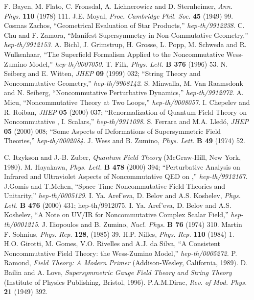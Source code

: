 \documentclass[a4paper,a4paper]{article}
\begin{document}
\begin{thebibliography}{Ref}
 F. Bayen, M. Flato, C. Fronsdal, A. Lichnerowicz and D. Sternheimer, 
{\sl Ann. Phys.} {\bf 110} (1978) 111. 
 J.E. Moyal, {\sl Proc. Cambridge Phil. Soc.} {\bf 45} (1949) 99.
 Cosmas Zachos, ``Geometrical Evaluation of Star Products,'' 
{\it hep-th/9912238}.
 C. Chu and F. Zamora, ``Manifest Supersymmetry in Non-Commutative 
Geometry,'' {\it hep-th/9912153}.
 A. Bichl, J. Grimstrup, H. Grosse, L. Popp, M. Schweda and R. Wulkenhaar, 
``The Superfield Formalism Applied to the Noncommutative Wess-Zumino Model,'' 
{\it hep-th/0007050}.
 T. Filk, {\sl Phys. Lett.} {\bf B 376} (1996) 53.
 N. Seiberg and E. Witten, {\sl JHEP} {\bf 09} (1999) 032; 
``String Theory and Noncommutative Geometry,'' {\it hep-th/9908142}.
 S. Minwalla, M. Van Raamsdonk and N. Seiberg, 
``Noncommutative Perturbative Dynamics,'' {\it hep-th/9912072}.
 A. Micu, ``Noncommutative \coordHE{} Theory at Two Loops,'' {\it hep-th/0008057}.
 I. Chepelev and R. Roiban, {\sl JHEP} {\bf 05} (2000) 037; 
``Renormalization of Quantum Field Theory on Noncommutative \coordHE{}, I. Scalars,'' 
{\it hep-th/9911098}.
 S. Ferrara and M.A. Lled\'{o}, {\sl JHEP} {\bf 05} (2000) 008; 
``Some Aspects of Deformations of Supersymmetric Field Theories,'' 
{\it hep-th/0002084}.
 J. Wess and B. Zumino, {\sl Phys. Lett.} {\bf B 49} (1974) 52.

 C. Itzykson and J.-B. Zuber, 
{\sl Quantum Field Theory} (McGraw-Hill, New York, 1980).
 M. Hayakawa, {\sl Phys. Lett.} {\bf B 478} (2000) 394; 
``Perturbative Analysis on Infrared and Ultraviolet Aspects of 
Noncommutative QED on \coordHE{},'' {\it hep-th/9912167}.
 J.Gomis and T.Mehen, 
``Space-Time Noncommutative Field Theories and Unitarity,'' {\it hep-th/0005129}.
 I. Ya. Aref'eva, D. Belov and A.S. Koshelev, {\sl Phys. Lett.} 
{\bf B 476} (2000) 431; 
hep-th/9912075. 
 I. Ya. Aref'eva, D. Belov and A.S. Koshelev, 
``A Note on UV/IR for Noncommutative Complex Scalar Field,'' {\it hep-th/0001215}. 
J. Iliopoulos and B. Zumino, {\sl Nucl. Phys.} {\bf B 76} (1974) 310.
Martin F. Sohnius, {\sl Phys. Rep.} {\bf 128}, (1985) 39.
 H.P. Nilles, {\sl Phys. Rep.} {\bf 110} (1984) 1. 
 H.O. Girotti, M. Gomes, V.O. Rivelles and A.J. da Silva, 
``A Consistent Noncommutative Field Theory: the Wess-Zumino Model,'' 
{\it hep-th/0005272}.
 P. Ramond, {\sl Field Theory: A Modern Primer} 
(Addison-Wesley, California, 1989).
 D. Bailin and A. Love, 
{\sl Supersymmetric Gauge Field Theory and String Theory} 
(Institute of Physics Publishing, Bristol, 1996).
 P.A.M.Dirac, {\sl Rev. of Mod. Phys.} {\bf 21} (1949) 392.

\end{thebibliography}
\end{document}
